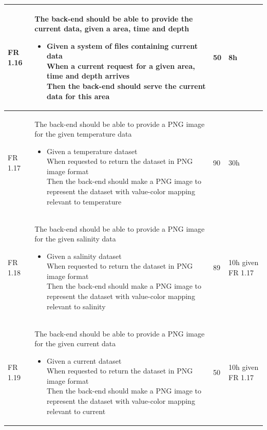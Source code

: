\documentclass[11pt,a4paper,titlepage,oneside]{report}
\begin{document}
\begin{longtable}{p{1.4cm} p{7.8cm} p{1cm} p{1cm} }
  FR 1.16 & The back-end should be able to provide the current data, given a area, time and depth
  \begin{itemize}
  \item \parbox[t]{6.8cm}{
        Given a system of files containing current data \\
        When a current request for a given area, time and depth arrives \\
        Then the back-end should serve the current data for this area}
  \end{itemize}
  & 50 & 8h \\ \hline

  FR 1.17 & The back-end should be able to provide a PNG image for the given temperature data
  \begin{itemize}
  \item \parbox[t]{6.8cm}{
        Given a temperature dataset \\
        When requested to return the dataset in PNG image format \\
        Then the back-end should make a PNG image to represent the dataset with value-color mapping relevant to temperature}
  \end{itemize}
  & 90 & 30h \\ \hline

  FR 1.18 & The back-end should be able to provide a PNG image for the given salinity data
  \begin{itemize}
  \item \parbox[t]{6.8cm}{
        Given a salinity dataset \\
        When requested to return the dataset in PNG image format \\
        Then the back-end should make a PNG image to represent the dataset with value-color mapping relevant to salinity}
  \end{itemize}
  & 89 & 10h given FR 1.17 \\ \hline

  FR 1.19 & The back-end should be able to provide a PNG image for the given current data
  \begin{itemize}
  \item \parbox[t]{6.8cm}{
        Given a current dataset \\
        When requested to return the dataset in PNG image format \\
        Then the back-end should make a PNG image to represent the dataset with value-color mapping relevant to current}
  \end{itemize}
  & 50 & 10h given FR 1.17  \\ \hline


\end{longtable}
\end{document}
